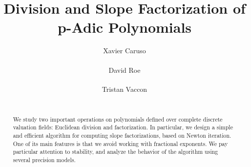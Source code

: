 \documentclass{sig-alternate-05-2015}
\newcommand{\RS}{\text{\rm RS}}
\begin{document}
\newtheorem{theo}{Theorem}[section]
\newtheorem{lem}[theo]{Lemma}
\newtheorem{prop}[theo]{Proposition}
\newtheorem{cor}[theo]{Corollary}
\newtheorem{quest}[theo]{Question}
\newtheorem{conj}[theo]{Conjecture}
\theoremstyle{definition}
\newtheorem{rem}[theo]{Remark}
\newtheorem{ex}[theo]{Example}
\newtheorem{deftn}[theo]{Definition}

\title{Division and Slope Factorization of p-Adic Polynomials}

\author{
\alignauthor Xavier Caruso\\
  \\
\alignauthor David Roe \\
  \\
\alignauthor Tristan Vaccon\\
  \\
}

\maketitle

\begin{abstract}
We study two important operations on polynomials defined over complete 
discrete valuation fields: Euclidean division and factorization. In particular,
we design a simple and efficient algorithm for computing slope factorizations,
based on Newton iteration.  One of its main features is that we avoid working
with fractional exponents.
We pay particular attention to stability, and analyze the behavior
of the algorithm using several precision models.
\end{abstract}


%
%
\end{document}
